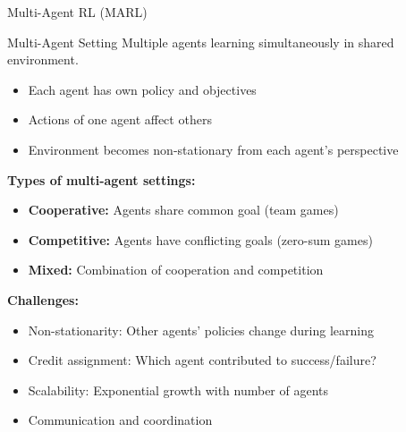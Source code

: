 \documentclass[aspectratio=169]{beamer}
\begin{document}
\begin{frame}{Multi-Agent RL (MARL)}
  \begin{definitionbox}{Multi-Agent Setting}
    Multiple agents learning simultaneously in shared environment.
    \begin{itemize}
      \item Each agent has own policy and objectives
      \item Actions of one agent affect others
      \item Environment becomes non-stationary from each agent's perspective
    \end{itemize}
  \end{definitionbox}

  \vspace{0.5em}

  \textbf{Types of multi-agent settings:}
  \begin{itemize}
    \item \textbf{Cooperative:} Agents share common goal (team games)
    \item \textbf{Competitive:} Agents have conflicting goals (zero-sum games)
    \item \textbf{Mixed:} Combination of cooperation and competition
  \end{itemize}

  \vspace{0.5em}

  \textbf{Challenges:}
  \begin{itemize}
    \item Non-stationarity: Other agents' policies change during learning
    \item Credit assignment: Which agent contributed to success/failure?
    \item Scalability: Exponential growth with number of agents
    \item Communication and coordination
  \end{itemize}
\end{frame}
\end{document}
